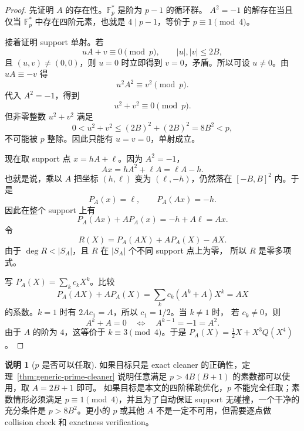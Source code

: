 \documentclass[11pt,a4paper]{ctexart}
\newcommand{\Fp}{\mathbb{F}_p}
\theoremstyle{definition}
\newtheorem{remark}{说明}
\begin{document}
\begin{proof}
先证明 $A$ 的存在性。$\Fp^\ast$ 是阶为 $p-1$ 的循环群。
$A^2=-1$ 的解存在当且仅当 $\Fp^\ast$ 中存在四阶元素，也就是
$4\mid p-1$，等价于 $p\equiv1\pmod4$。

接着证明 support 单射。若
\[
  uA+v\equiv0\pmod p,\qquad |u|,|v|\le2B,
\]
且 $(u,v)\ne(0,0)$，则 $u=0$ 时立即得到 $v=0$，矛盾。所以可设
$u\ne0$。由 $uA\equiv-v$ 得
\[
  u^2A^2\equiv v^2\pmod p.
\]
代入 $A^2=-1$，得到
\[
  u^2+v^2\equiv0\pmod p.
\]
但非零整数 $u^2+v^2$ 满足
\[
  0<u^2+v^2\le (2B)^2+(2B)^2=8B^2<p,
\]
不可能被 $p$ 整除。因此只能有 $u=v=0$，单射成立。

现在取 support 点 $x=hA+\ell$。因为 $A^2=-1$，
\[
  Ax=hA^2+\ell A=\ell A-h.
\]
也就是说，乘以 $A$ 把坐标 $(h,\ell)$ 变为 $(\ell,-h)$，仍然落在
$[-B,B]^2$ 内。于是
\[
  P_A(x)=\ell,\qquad P_A(Ax)=-h.
\]
因此在整个 support 上有
\[
  P_A(Ax)+AP_A(x)=-h+A\ell=Ax.
\]
令
\[
  R(X)=P_A(AX)+AP_A(X)-AX.
\]
由于 $\deg R<|S_A|$，且 $R$ 在 $|S_A|$ 个不同 support 点上为零，
所以 $R$ 是零多项式。

写 $P_A(X)=\sum_k c_kX^k$。比较
\[
  P_A(AX)+AP_A(X)=\sum_k c_k(A^k+A)X^k=AX
\]
的系数。$k=1$ 时有 $2Ac_1=A$，所以 $c_1=1/2$。当 $k\ne1$ 时，
若 $c_k\ne0$，则
\[
  A^k+A=0
  \quad\Longleftrightarrow\quad
  A^{k-1}=-1=A^2.
\]
由于 $A$ 的阶为 $4$，这等价于 $k\equiv3\pmod4$。于是
$P_A(X)=\frac12X+X^3Q(X^4)$。
\end{proof}

\begin{remark}[$p$ 是否可以任取]
如果目标只是 exact cleaner 的正确性，定理~\ref{thm:generic-prime-cleaner}
说明任意满足 $p>4B(B+1)$ 的素数都可以使用，取 $A=2B+1$ 即可。
如果目标是本文的四阶稀疏优化，$p$ 不能完全任取；素数情形必须满足
$p\equiv1\pmod4$，并且为了自动保证 support 无碰撞，一个干净的充分条件是
$p>8B^2$。更小的 $p$ 或其他 $A$ 不是一定不可用，但需要逐点做 collision
check 和 exactness verification。
\end{remark}

\begin{center}
\end{center}
\end{document}
